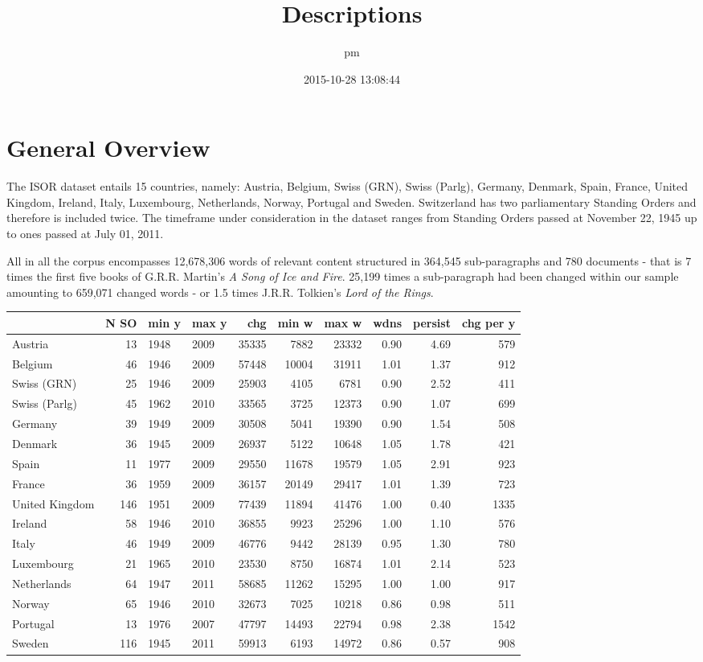 \documentclass[a4paper]{article}
\title{Descriptions}
\author{pm}
\date{2015-10-28 13:08:44}
\begin{document}
\maketitle

\section{General Overview}\label{general-overview}

The ISOR dataset entails 15 countries, namely: Austria, Belgium, Swiss
(GRN), Swiss (Parlg), Germany, Denmark, Spain, France, United Kingdom,
Ireland, Italy, Luxembourg, Netherlands, Norway, Portugal and Sweden.
Switzerland has two parliamentary Standing Orders and therefore is
included twice. The timeframe under consideration in the dataset ranges
from Standing Orders passed at November 22, 1945 up to ones passed at
July 01, 2011.

All in all the corpus encompasses 12,678,306 words of relevant content
structured in 364,545 sub-paragraphs and 780 documents - that is 7 times
the first five books of G.R.R. Martin's \emph{A Song of Ice and Fire}.
25,199 times a sub-paragraph had been changed within our sample
amounting to 659,071 changed words - or 1.5 times J.R.R. Tolkien's
\emph{Lord of the Rings}.

\begin{longtable}[c]{@{}lrllrrrrrr@{}}
\toprule
& N SO & min y & max y & chg & min w & max w & wdns & persist & chg per
y\tabularnewline
\midrule
\endhead
Austria & 13 & 1948 & 2009 & 35335 & 7882 & 23332 & 0.90 & 4.69 &
579\tabularnewline
Belgium & 46 & 1946 & 2009 & 57448 & 10004 & 31911 & 1.01 & 1.37 &
912\tabularnewline
Swiss (GRN) & 25 & 1946 & 2009 & 25903 & 4105 & 6781 & 0.90 & 2.52 &
411\tabularnewline
Swiss (Parlg) & 45 & 1962 & 2010 & 33565 & 3725 & 12373 & 0.90 & 1.07 &
699\tabularnewline
Germany & 39 & 1949 & 2009 & 30508 & 5041 & 19390 & 0.90 & 1.54 &
508\tabularnewline
Denmark & 36 & 1945 & 2009 & 26937 & 5122 & 10648 & 1.05 & 1.78 &
421\tabularnewline
Spain & 11 & 1977 & 2009 & 29550 & 11678 & 19579 & 1.05 & 2.91 &
923\tabularnewline
France & 36 & 1959 & 2009 & 36157 & 20149 & 29417 & 1.01 & 1.39 &
723\tabularnewline
United Kingdom & 146 & 1951 & 2009 & 77439 & 11894 & 41476 & 1.00 & 0.40
& 1335\tabularnewline
Ireland & 58 & 1946 & 2010 & 36855 & 9923 & 25296 & 1.00 & 1.10 &
576\tabularnewline
Italy & 46 & 1949 & 2009 & 46776 & 9442 & 28139 & 0.95 & 1.30 &
780\tabularnewline
Luxembourg & 21 & 1965 & 2010 & 23530 & 8750 & 16874 & 1.01 & 2.14 &
523\tabularnewline
Netherlands & 64 & 1947 & 2011 & 58685 & 11262 & 15295 & 1.00 & 1.00 &
917\tabularnewline
Norway & 65 & 1946 & 2010 & 32673 & 7025 & 10218 & 0.86 & 0.98 &
511\tabularnewline
Portugal & 13 & 1976 & 2007 & 47797 & 14493 & 22794 & 0.98 & 2.38 &
1542\tabularnewline
Sweden & 116 & 1945 & 2011 & 59913 & 6193 & 14972 & 0.86 & 0.57 &
908\tabularnewline
\bottomrule
\end{longtable}
\end{document}
